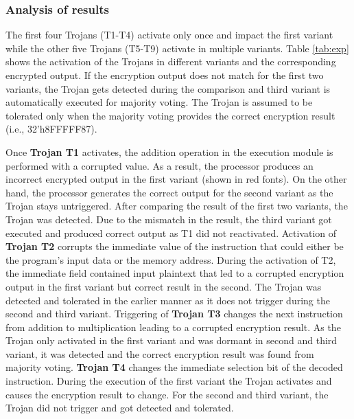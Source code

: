 \documentclass[conference]{IEEEtran}
\begin{document}
\subsubsection{Analysis of results} 
The first four Trojans (T1-T4) activate only once and impact the first variant while the other five Trojans (T5-T9) activate in multiple variants. Table \ref{tab:exp} shows the activation of the Trojans in different variants and the corresponding encrypted output. If the encryption output does not match for the first two variants, the Trojan gets detected during the comparison and third variant is automatically executed for majority voting. 
The Trojan is assumed to be tolerated only when the majority voting provides the correct encryption result (i.e., 32'h8FFFFF87). 

 Once \textbf{Trojan T1} activates, the addition operation in the execution module is performed with a corrupted value. As a result, the processor produces an incorrect encrypted output in the first variant (shown in red fonts). On the other hand, the processor generates the correct output for the second variant as the Trojan stays untriggered. After comparing the result of the first two variants, the Trojan was detected. Due to the mismatch in the result, the third variant got executed and produced correct output as T1 did not reactivated.
 Activation of \textbf{Trojan T2} corrupts the immediate value of the instruction that could either be the program's input data or the memory address. During the activation of T2, the immediate field contained input plaintext that led to a corrupted encryption output in the first variant but correct result in the second. The Trojan was detected and tolerated in the earlier manner as it does not trigger during the second and third variant. 
Triggering of \textbf{Trojan T3} changes the next instruction from addition to multiplication leading to a corrupted encryption result. As the Trojan only activated in the first variant and was dormant in second and third variant, it was detected and the correct encryption result was found from majority voting. \textbf{Trojan T4} changes the immediate selection bit of the decoded instruction. During the execution of the first variant the Trojan activates and causes the encryption result to change. For the second and third variant, the Trojan did not trigger and got detected and tolerated.
\end{document}
